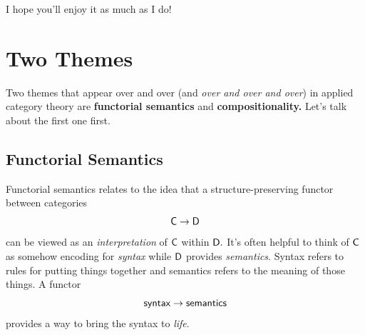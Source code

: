 \documentclass{tufte-handout-tai}
\newcommand{\cat}[1]{{\normalfont\textsf{#1}}}
\theoremstyle{plain}
\theoremstyle{definition}
\theoremstyle{remark}
\begin{document}
\noindent I hope you'll enjoy it as much as I do!
\vspace{3cm}







\newpage
\section{Two Themes}\label{sec:Themes}
Two themes that appear over and over (and \textit{over and over and over}) in applied category theory are \textbf{functorial semantics} and \textbf{compositionality.} Let's talk about the first one first.
\subsection{Functorial Semantics}\label{sec:Func}
Functorial semantics relates to the idea that a structure-preserving functor between categories
\[\cat{C}\to\cat{D}\]
can be viewed as an \textit{interpretation} of $\cat{C}$ within $\cat{D}.$ 
It's often helpful to think of $\cat{C}$ as somehow encoding for \textit{syntax} while $\cat{D}$ provides \textit{semantics}. Syntax refers to rules for putting things together and semantics refers to the meaning of those things. A functor
\[\cat{syntax} \to \cat{semantics}\]
provides a way to bring the syntax to \textit{life}.
\end{document}
